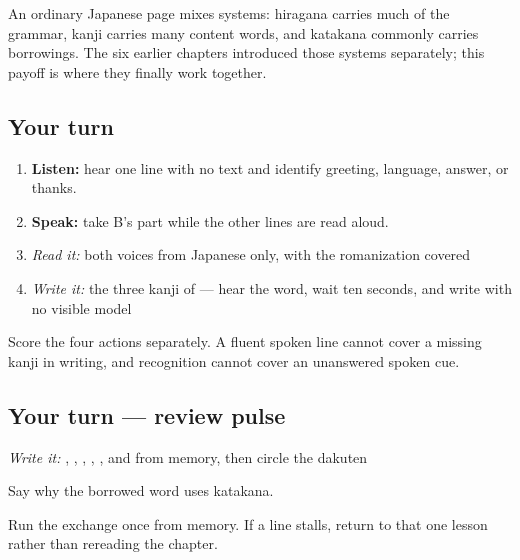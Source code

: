 An ordinary Japanese page mixes systems: hiragana carries much of the grammar, kanji carries many content words, and katakana commonly carries borrowings. The six earlier chapters introduced those systems separately; this payoff is where they finally work together.

\subsection*{Your turn}
\begin{enumerate}
\raggedright
  \item \textbf{Listen:} hear one line with no text and identify greeting, language, answer, or thanks.
  \item \textbf{Speak:} take B's part while the other lines are read aloud.
  \item \emph{Read it:} both voices from Japanese only, with the romanization covered
  \item \emph{Write it:} the three kanji of \textbf{} — hear the word, wait ten seconds, and write with no visible model
\end{enumerate}

Score the four actions separately. A fluent spoken line cannot cover a missing kanji in writing, and recognition cannot cover an unanswered spoken cue.

\subsection*{Your turn — review pulse}
\emph{Write it:} \textbf{}, \textbf{}, \textbf{}, \textbf{}, \textbf{}, and \textbf{} from memory, then circle the dakuten

Say why the borrowed word uses katakana.

\begin{tcolorbox}[breakable,colback=teal!4,colframe=teal!35!black,title={Before you move on}]
Run the exchange once from memory. If a line stalls, return to that one lesson rather than rereading the chapter.
\end{tcolorbox}
